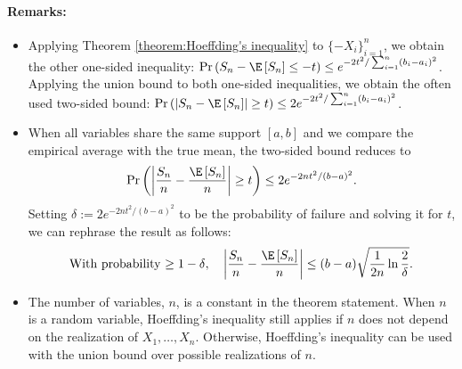 \paragraph{Remarks:}
\begin{itemize}
    \item Applying Theorem \ref{theorem:Hoeffding's inequality} to $\{-X_i\}_{i=1}^n$, we obtain the other one-sided inequality:
    $\Pr\left(S_n-\E\left[S_n\right] \leq-t\right) \leq e^{-2 t^2 / \sum_{i=1}^n\left(b_i-a_i\right)^2}$.
    Applying the union bound to both one-sided inequalities, we obtain the often used two-sided bound:
    $\Pr\left(\left|S_n-\E\left[S_n\right]\right| \geq t\right) \leq 2 e^{-2 t^2 / \sum_{i=1}^n\left(b_i-a_i\right)^2}$.
    \item When all variables share the same support $[a,b]$ and we compare the empirical average with the true mean, the two-sided bound reduces to
    \begin{align*}
        \Pr\left(\left|\frac{S_n}{n}-\frac{\E\left[S_n\right]}{n}\right| \geq t\right) \leq 2 e^{-2 n t^2 / \left(b-a\right)^2}.
    \end{align*}
    Setting $\delta:=2 e^{-2 n t^2 / \left(b-a\right)^2}$ to be the probability of failure and solving it for $t$, we can rephrase the result as follows: 
    \begin{align*}
        \text{With probability $\geq1-\delta$}, \quad \left|\frac{S_n}{n}-\frac{\E\left[S_n\right]}{n}\right| \leq(b-a) \sqrt{\frac{1}{2 n} \ln \frac{2}{\delta}}.
    \end{align*}
    \item The number of variables, $n$, is a constant in the theorem statement. When $n$ is a random variable, Hoeffding's inequality still applies if $n$ does not depend on the realization of $X_1, \ldots, X_n$. Otherwise, Hoeffding's inequality can be used with the union bound over possible realizations of $n$.
\end{itemize}



